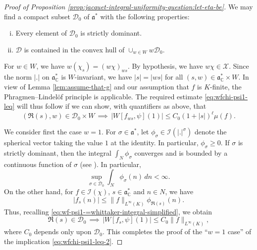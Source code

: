 \begin{proof}[Proof of Proposition \ref{prop:jacquet-integral-uniformity-question:let-eta-be}]
  We may find a compact subset $\mathcal{D}_0$ of $\mathfrak{a}^*$ with the following properties:
  \begin{enumerate}[(i)]
  \item Every element of $\mathcal{D}_0$ is strictly dominant.
  \item $\mathcal{D}$ is contained in the convex hull of $\cup_{w \in W} w \mathcal{D}_0$.
  \end{enumerate}
  For $w \in W$, we have $w(\chi_s) = (w \chi)_{w s}$.  By hypothesis, we have $w \chi \in \mathcal{X}$.  Since the norm $|.|$ on $\mathfrak{a}_{\mathbb{C}}^*$ is $W$-invariant, we have $|s| = |w s|$ for all $(s,w) \in \mathfrak{a}_{\mathbb{C}}^* \times W$.  In view of Lemma \ref{lem:assume-that-g} and our assumption that $f$ is $K$-finite, the Phragmen--Lindel\"{o}f principle is applicable.  The required estimate \eqref{eq:wfchi-psi1-leq} will thus follow if we can show, with quantifiers as above, that
  \begin{equation}\label{eq:wfchi-psi1-leq-2}
    (\Re(s),w) \in \mathcal{D}_0 \times W \, \implies \,
    |W[f_{w s}, \psi](1)| \leq C_0 (1 + |s|)^{\ell} \mu(f).
  \end{equation}

  We consider first the case $w = 1$.  For $\sigma \in \mathfrak{a}^*$, let $\phi_{\sigma } \in \mathcal{I}(|.|^{\sigma})$ denote the spherical vector taking the value $1$ at the identity.  In particular, $\phi_\sigma \geq 0$.  If $\sigma$ is strictly dominant, then the integral $\int_{N} \phi_\sigma$ converges and is bounded by a continuous function of $\sigma$ (see \cite[\S10.1.2]{MR1170566}).  In particular,
  \begin{equation*}
    \sup_{\sigma \in \mathcal{D}_0} \int_N \phi_\sigma(n) \, d n < \infty.
  \end{equation*}
  On the other hand, for $f \in \mathcal{I}(\chi)$, $s \in \mathfrak{a}_\mathbb{C}^*$ and $n \in N$, we have
  \begin{equation*}
    |f_s(n)| \leq \|f\|_{L^\infty(K)} \phi_{\Re(s)}(n).
  \end{equation*}
  Thus, recalling \eqref{eq:wf-psi1-=whittaker-integral-simplified}, we obtain
  \begin{equation*}
    \Re(s) \in \mathcal{D}_0
    \,
    \implies
    \,
    |W[f_s,\psi](1)|
    \leq
    C_0
    \|f\|_{L^\infty(K)},
  \end{equation*}
  where $C_0$ depends only upon $\mathcal{D}_0$.
  This completes the proof of the ``$w = 1$ case'' of the implication \eqref{eq:wfchi-psi1-leq-2}.


\end{proof}
